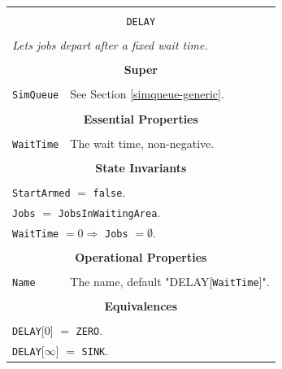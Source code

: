 \documentclass[12pt]{book}
\begin{document}
\begin{tabular}{|l|l|l|}
\hline
\multicolumn{3}{|c|}{} \\
\multicolumn{3}{|c|}{\lstinline[basicstyle=\large]{DELAY}} \\
\multicolumn{3}{|c|}{} \\
\hline
\multicolumn{3}{|l|}{\em Lets jobs depart after a fixed wait time.} \\
\hline
\multicolumn{3}{|c|}{} \\
\multicolumn{3}{|c|}{\bf Super} \\
\multicolumn{3}{|c|}{} \\
\hline
\lstinline|SimQueue| & \multicolumn{2}{|l|}{See Section \ref{simqueue-generic}.} \\
\hline
\multicolumn{3}{|c|}{} \\
\multicolumn{3}{|c|}{\bf Essential Properties} \\
\multicolumn{3}{|c|}{} \\
\hline
\lstinline|WaitTime|  & \multicolumn{2}{|l|}{The wait time, non-negative.} \\
\hline
\multicolumn{3}{|c|}{} \\
\multicolumn{3}{|c|}{\bf State  Invariants} \\
\multicolumn{3}{|c|}{} \\
\hline
\multicolumn{3}{|l|}{\lstinline|StartArmed| $=$ \lstinline|false|.} \\
\multicolumn{3}{|l|}{\lstinline|Jobs| $=$ \lstinline|JobsInWaitingArea|.} \\
\multicolumn{3}{|l|}{\lstinline|WaitTime| $= 0 \Rightarrow$ \lstinline|Jobs| $= \emptyset$.} \\
\hline
\multicolumn{3}{|c|}{} \\
\multicolumn{3}{|c|}{\bf Operational Properties} \\
\multicolumn{3}{|c|}{} \\
\hline
\lstinline|Name| & \multicolumn{2}{|l|}{The name, default "DELAY[\lstinline|WaitTime|]".} \\
\hline
\multicolumn{3}{|c|}{} \\
\multicolumn{3}{|c|}{\bf Equivalences} \\
\multicolumn{3}{|c|}{} \\
\hline
\multicolumn{3}{|l|}{\lstinline|DELAY|[$0$] $=$ \lstinline|ZERO|.} \\
\multicolumn{3}{|l|}{\lstinline|DELAY|[$\infty$] $=$ \lstinline|SINK|.} \\
\hline
\end{tabular}
\end{document}
